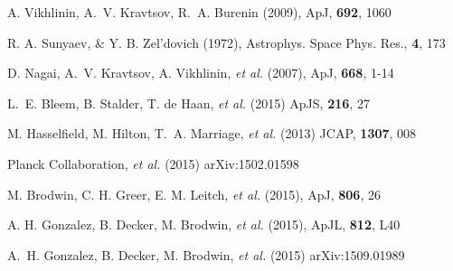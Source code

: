 \documentclass[11pt,a4paper,twoside,graphicx,color]{article}
\begin{document}
\begin{thebibliography}{9}

   {\small A. Vikhlinin, A.~V. Kravtsov, R.~A. Burenin (2009), ApJ, \textbf{692}, 1060}
   
  {\small R. A. Sunyaev, \& Y. B. Zel'dovich (1972), Astrophys. Space Phys. Res., \textbf{4}, 173}
  
  {\small D. Nagai, A.~V. Kravtsov, A. Vikhlinin, {\it et al.} (2007), ApJ, \textbf{668}, 1-14}

 {\small L.~E. Bleem, B. Stalder, T. de Haan, {\it et al.} (2015) ApJS, \textbf{216}, 27}
 
 {\small M. Hasselfield, M. Hilton, T.~A. Marriage, {\it et al.} (2013) JCAP, \textbf{1307}, 008}
 
 {\small {Planck Collaboration}, {\it et al.} (2015) arXiv:1502.01598}



  
   {\small M. Brodwin, C. H. Greer, E. M. Leitch, {\it et al.} (2015), ApJ, \textbf{806}, 26}

  {\small A. H. Gonzalez, B. Decker, M. Brodwin, {\it et al.} (2015), ApJL, \textbf{812}, L40}
  
 {\small A.~H. Gonzalez, B. Decker, M. Brodwin, {\it et al.} (2015) arXiv:1509.01989}
  
  
  
  

\end{thebibliography}
\end{document}
